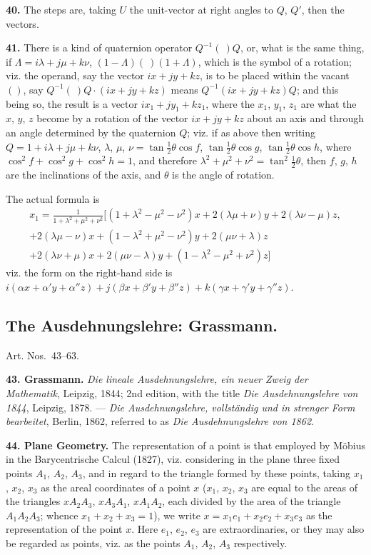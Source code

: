 \documentclass[11pt,a4paper]{book}
\begin{document}
\textbf{40.} The steps are, taking $U$ the unit-vector at right angles to $Q$, $Q'$, then the vectors.

\textbf{41.} There is a kind of quaternion operator $Q^{-1}(\ )Q$, or, what is the same thing, if $\Lambda = i\lambda + j\mu + k\nu$, $(1 - \Lambda)(\ )(1 + \Lambda)$, which is the symbol of a rotation; viz. the operand, say the vector $ix + jy + kz$, is to be placed within the vacant $( )$, say $Q^{-1}(\ )Q \cdot (ix + jy + kz)$ means $Q^{-1}(ix + jy + kz)Q$; and this being so, the result is a vector $ix_1 + jy_1 + kz_1$, where the $x_1$, $y_1$, $z_1$ are what the $x$, $y$, $z$ become by a rotation of the vector $ix + jy + kz$ about an axis and through an angle determined by the quaternion $Q$; viz. if as above then writing $Q = 1 + i\lambda + j\mu + k\nu$, $\lambda$, $\mu$, $\nu = \tan\tfrac{1}{2}\theta \cos f$, $\tan\tfrac{1}{2}\theta \cos g$, $\tan\tfrac{1}{2}\theta \cos h$, where $\cos^2 f + \cos^2 g + \cos^2 h = 1$, and therefore $\lambda^2 + \mu^2 + \nu^2 = \tan^2\tfrac{1}{2}\theta$, then $f$, $g$, $h$ are the inclinations of the axis, and $\theta$ is the angle of rotation.

The actual formula is
\begin{multline*}
x_1 = \frac{1}{1 + \lambda^2 + \mu^2 + \nu^2} [(1 + \lambda^2 - \mu^2 - \nu^2)x + 2(\lambda\mu + \nu)y + 2(\lambda\nu - \mu)z, \\
+ 2(\lambda\mu - \nu)x + (1 - \lambda^2 + \mu^2 - \nu^2)y + 2(\mu\nu + \lambda)z \\
+ 2(\lambda\nu + \mu)x + 2(\mu\nu - \lambda)y + (1 - \lambda^2 - \mu^2 + \nu^2)z]
\end{multline*}
viz. the form on the right-hand side is $i(\alpha x + \alpha' y + \alpha'' z) + j(\beta x + \beta' y + \beta'' z) + k(\gamma x + \gamma' y + \gamma'' z)$.

\subsection*{The Ausdehnungslehre: Grassmann.}

Art. Nos.~43--63.

\textbf{43. Grassmann.} \textit{Die lineale Ausdehnungslehre, ein neuer Zweig der Mathematik}, Leipzig, 1844; 2nd edition, with the title \textit{Die Ausdehnungslehre von 1844}, Leipzig, 1878. --- \textit{Die Ausdehnungslehre, vollst\"andig und in strenger Form bearbeitet}, Berlin, 1862, referred to as \textit{Die Ausdehnungslehre von 1862}.

\textbf{44. Plane Geometry.} The representation of a point is that employed by M\"obius in the Barycentrische Calcul (1827), viz. considering in the plane three fixed points $A_1$, $A_2$, $A_3$, and in regard to the triangle formed by these points, taking $x_1$, $x_2$, $x_3$ as the areal coordinates of a point $x$ ($x_1$, $x_2$, $x_3$ are equal to the areas of the triangles $xA_2A_3$, $xA_3A_1$, $xA_1A_2$, each divided by the area of the triangle $A_1A_2A_3$; whence $x_1 + x_2 + x_3 = 1$), we write $x = x_1e_1 + x_2e_2 + x_3e_3$ as the representation of the point $x$. Here $e_1$, $e_2$, $e_3$ are extraordinaries, or they may also be regarded as points, viz. as the points $A_1$, $A_2$, $A_3$ respectively.
\end{document}
